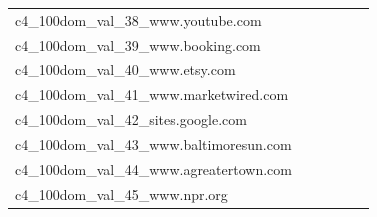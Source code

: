 \documentclass[dvipsnames]{article}
\begin{document}
\begin{appendix}
{\begin{longtable}{m{6cm}m{1.7cm}m{1.7cm}m{1.7cm}m{1.7cm}m{1.7cm}}
	c4\_100dom\_val\_38\_www.youtube.com  & \colorbox[HTML]{fdfede}{\makebox[\mywidth][c]{8.42}} & \colorbox[HTML]{f2fab5}{\makebox[\mywidth][c]{8.24}} & \colorbox[HTML]{ffffe5}{\makebox[\mywidth][c]{8.83}} & \colorbox[HTML]{ebf7b0}{\makebox[\mywidth][c]{8.22}} & \colorbox[HTML]{77c578}{\makebox[\mywidth][c]{8.07}}\\
	c4\_100dom\_val\_39\_www.booking.com  & \colorbox[HTML]{ffffe5}{\makebox[\mywidth][c]{8.84}} & \colorbox[HTML]{fafdcd}{\makebox[\mywidth][c]{8.49}} & \colorbox[HTML]{ffffe5}{\makebox[\mywidth][c]{8.83}} & \colorbox[HTML]{e9f6af}{\makebox[\mywidth][c]{8.41}} & \colorbox[HTML]{77c578}{\makebox[\mywidth][c]{8.32}}\\
	c4\_100dom\_val\_40\_www.etsy.com  & \colorbox[HTML]{fcfed8}{\makebox[\mywidth][c]{11.93}} & \colorbox[HTML]{ebf7b0}{\makebox[\mywidth][c]{11.66}} & \colorbox[HTML]{ffffe5}{\makebox[\mywidth][c]{12.66}} & \colorbox[HTML]{bde395}{\makebox[\mywidth][c]{11.52}} & \colorbox[HTML]{77c578}{\makebox[\mywidth][c]{11.43}}\\
	c4\_100dom\_val\_41\_www.marketwired.com  & \colorbox[HTML]{ffffe5}{\makebox[\mywidth][c]{7.66}} & \colorbox[HTML]{fafdce}{\makebox[\mywidth][c]{7.47}} & \colorbox[HTML]{ffffe5}{\makebox[\mywidth][c]{7.88}} & \colorbox[HTML]{ccea9c}{\makebox[\mywidth][c]{7.33}} & \colorbox[HTML]{77c578}{\makebox[\mywidth][c]{7.27}}\\
	c4\_100dom\_val\_42\_sites.google.com  & \colorbox[HTML]{fefee0}{\makebox[\mywidth][c]{14.23}} & \colorbox[HTML]{f2fab5}{\makebox[\mywidth][c]{13.81}} & \colorbox[HTML]{ffffe5}{\makebox[\mywidth][c]{14.91}} & \colorbox[HTML]{d5eea1}{\makebox[\mywidth][c]{13.68}} & \colorbox[HTML]{77c578}{\makebox[\mywidth][c]{13.51}}\\
	c4\_100dom\_val\_43\_www.baltimoresun.com  & \colorbox[HTML]{fefee3}{\makebox[\mywidth][c]{11.57}} & \colorbox[HTML]{eff8b3}{\makebox[\mywidth][c]{11.16}} & \colorbox[HTML]{ffffe5}{\makebox[\mywidth][c]{11.96}} & \colorbox[HTML]{dbf1a4}{\makebox[\mywidth][c]{11.09}} & \colorbox[HTML]{77c578}{\makebox[\mywidth][c]{10.95}}\\
	c4\_100dom\_val\_44\_www.agreatertown.com  & \colorbox[HTML]{ffffe5}{\makebox[\mywidth][c]{13.56}} & \colorbox[HTML]{fafdcd}{\makebox[\mywidth][c]{12.94}} & \colorbox[HTML]{ffffe5}{\makebox[\mywidth][c]{13.57}} & \colorbox[HTML]{ddf1a6}{\makebox[\mywidth][c]{12.77}} & \colorbox[HTML]{77c578}{\makebox[\mywidth][c]{12.64}}\\
	c4\_100dom\_val\_45\_www.npr.org  & \colorbox[HTML]{fdfede}{\makebox[\mywidth][c]{10.59}} & \colorbox[HTML]{e6f5ad}{\makebox[\mywidth][c]{10.30}} & \colorbox[HTML]{ffffe5}{\makebox[\mywidth][c]{11.14}} & \colorbox[HTML]{b6e092}{\makebox[\mywidth][c]{10.19}} & \colorbox[HTML]{77c578}{\makebox[\mywidth][c]{10.12}}\\

\end{longtable}}
\end{appendix}
\end{document}
